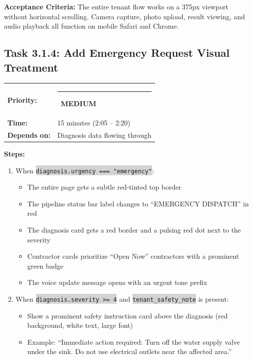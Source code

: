 \documentclass[11pt, a4paper]{article}
\newcommand{\medpri}{\textcolor{medgreen}{\rule{6pt}{6pt}}~\textcolor{medgreen}{\scriptsize\textbf{MEDIUM}}}
\newcommand{\code}[1]{\texttt{\small\colorbox{lightgray}{#1}}}
\begin{document}
\textbf{Acceptance Criteria:} The entire tenant flow works on a 375px viewport without horizontal scrolling. Camera capture, photo upload, result viewing, and audio playback all function on mobile Safari and Chrome.

\vspace{1em}

\subsection{Task 3.1.4: Add Emergency Request Visual Treatment}

\begin{tabularx}{\textwidth}{lX}
\textbf{Priority:} & \medpri \\
\textbf{Time:} & 15 minutes (2:05 -- 2:20) \\
\textbf{Depends on:} & Diagnosis data flowing through \\
\end{tabularx}

\vspace{0.3em}

\textbf{Steps:}
\begin{enumerate}[leftmargin=2em, itemsep=2pt]
  \item When \code{diagnosis.urgency === "emergency"}:
    \begin{itemize}[itemsep=1pt]
      \item The entire page gets a subtle red-tinted top border
      \item The pipeline status bar label changes to ``EMERGENCY DISPATCH'' in red
      \item The diagnosis card gets a red border and a pulsing red dot next to the severity
      \item Contractor cards prioritize ``Open Now'' contractors with a prominent green badge
      \item The voice update message opens with an urgent tone prefix
    \end{itemize}

  \item When \code{diagnosis.severity >= 4} and \code{tenant\_safety\_note} is present:
    \begin{itemize}[itemsep=1pt]
      \item Show a prominent safety instruction card above the diagnosis (red background, white text, large font)
      \item Example: ``Immediate action required: Turn off the water supply valve under the sink. Do not use electrical outlets near the affected area.''
    \end{itemize}
\end{enumerate}
\end{document}
